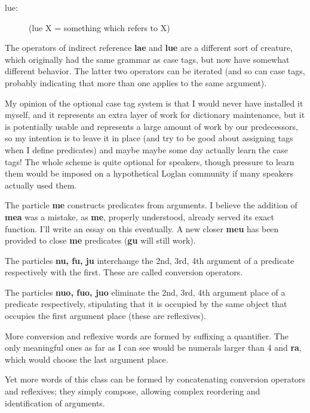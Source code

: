 \documentclass[12pt]{book}
\begin{document}
{\begin{description}
\item[lue:] (lue X = something which refers to X)

\end{description}  The operators of indirect reference {\bf lae} and {\bf lue} are a different sort of creature, which originally had the same grammar as case tags, but now have somewhat different behavior.   The latter two operators can be iterated (and so can case tags, probably indicating that more than one applies to the same argument).

My opinion of the optional case tag system is that I would never have installed it myself, and it represents an extra layer of work for dictionary maintenance, but it is potentially usable and represents a large amount of work by our predecessors, so my intention is to leave it in place (and try to be good about assigning tags when I define predicates) and maybe maybe some day actually learn the case tags!   The whole scheme is quite optional for speakers, though pressure to learn them would be imposed on a hypothetical Loglan community if many speakers actually used them.

The particle {\bf me} constructs predicates from arguments.   I believe the addition of {\bf mea} was a mistake, as {\bf me}, properly understood, already served its exact function.  I'll write an essay on this eventually.  A new closer {\bf meu} has been provided to close {\bf me} predicates
({\bf gu} will still work).

The particles {\bf nu, fu, ju} interchange the 2nd, 3rd, 4th argument of a predicate respectively with the first.   These are called conversion operators.

The particles {\bf nuo, fuo, juo} eliminate the 2nd, 3rd, 4th argument place of a predicate respectively, stipulating that it is occupied by the same object that occupies the first argument place
(these are reflexives).

More conversion and reflexive words are formed by suffixing a quantifier.   The only meaningful ones as far as I can see would be numerals larger than 4 and {\bf ra}, which would choose the last argument place.

Yet more words of this class can be formed by concatenating conversion operators and reflexives; they simply compose, allowing complex reordering and identification of arguments.

}
\end{document}
